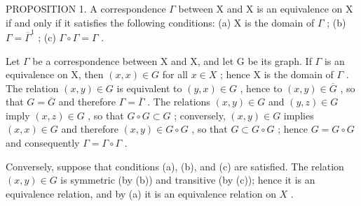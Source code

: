 PROPOSITION 1. A correspondence \(\Gamma\) between X and X is an equivalence on X if and only if it satisfies the following conditions: (a) X is the domain of \(\Gamma\) ; (b) \(\Gamma = \overline{\Gamma}^1\) ; (c) \(\Gamma \circ \Gamma = \Gamma\) .

Let \(\Gamma\) be a correspondence between X and X, and let G be its graph. If \(\Gamma\) is an equivalence on X, then \((x, x) \in G\) for all \(x \in X\) ; hence X is the domain of \(\Gamma\) . The relation \((x, y) \in G\) is equivalent to \((y, x) \in G\) , hence to \((x, y) \in \overline{G}\) , so that \(G = \overline{G}\) and therefore \(\Gamma = \overline{\Gamma}\) . The relations \((x, y) \in G\) and \((y, z) \in G\) imply \((x, z) \in G\) , so that \(G \circ G \subset G\) ; conversely, \((x, y) \in G\) implies \((x, x) \in G\) and therefore \((x, y) \in G \circ G\) , so that \(G \subset G \circ G\) ; hence \(G = G \circ G\) and consequently \(\Gamma = \Gamma \circ \Gamma\) .

Conversely, suppose that conditions (a), (b), and (c) are satisfied. The relation \((x, y) \in G\) is symmetric (by (b)) and transitive (by (c)); hence it is an equivalence relation, and by (a) it is an equivalence relation on \(X\) .

